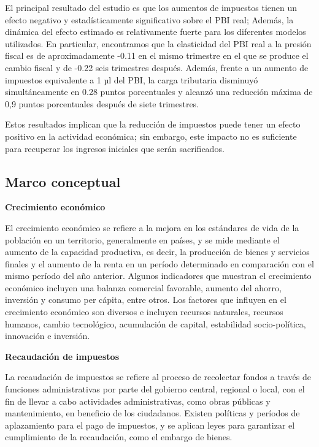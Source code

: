 \documentclass[
  letterpaper,
]{article}
\begin{document}
El principal resultado del estudio es que los aumentos de impuestos
tienen un efecto negativo y estadísticamente significativo sobre el PBI
real; Además, la dinámica del efecto estimado es relativamente fuerte
para los diferentes modelos utilizados. En particular, encontramos que
la elasticidad del PBI real a la presión fiscal es de aproximadamente
-0.11 en el mismo trimestre en el que se produce el cambio fiscal y de
-0.22 seis trimestres después. Además, frente a un aumento de impuestos
equivalente a 1 µl del PBI, la carga tributaria disminuyó
simultáneamente en 0.28 puntos porcentuales y alcanzó una reducción
máxima de 0,9 puntos porcentuales después de siete trimestres.

Estos resultados implican que la reducción de impuestos puede tener un
efecto positivo en la actividad económica; sin embargo, este impacto no
es suficiente para recuperar los ingresos iniciales que serán
sacrificados.

\hypertarget{marco-conceptual}{%
\subsection{Marco conceptual}\label{marco-conceptual}}

\textbf{Crecimiento económico}

El crecimiento económico se refiere a la mejora en los estándares de
vida de la población en un territorio, generalmente en países, y se mide
mediante el aumento de la capacidad productiva, es decir, la producción
de bienes y servicios finales y el aumento de la renta en un período
determinado en comparación con el mismo período del año anterior.
Algunos indicadores que muestran el crecimiento económico incluyen una
balanza comercial favorable, aumento del ahorro, inversión y consumo per
cápita, entre otros. Los factores que influyen en el crecimiento
económico son diversos e incluyen recursos naturales, recursos humanos,
cambio tecnológico, acumulación de capital, estabilidad socio-política,
innovación e inversión.

\textbf{Recaudación de impuestos}

La recaudación de impuestos se refiere al proceso de recolectar fondos a
través de funciones administrativas por parte del gobierno central,
regional o local, con el fin de llevar a cabo actividades
administrativas, como obras públicas y mantenimiento, en beneficio de
los ciudadanos. Existen políticas y períodos de aplazamiento para el
pago de impuestos, y se aplican leyes para garantizar el cumplimiento de
la recaudación, como el embargo de bienes.
\end{document}

